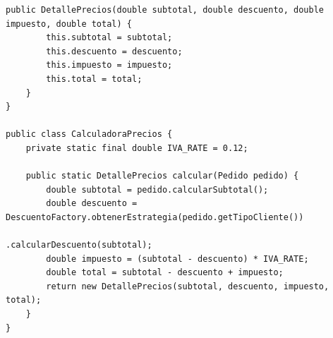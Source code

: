 \documentclass[12pt, a4paper]{article}
\begin{document}
\begin{lstlisting}[caption={Clases de Dominio, Validación y Cálculo de Precios}, label={lst:dominio}]
    public DetallePrecios(double subtotal, double descuento, double impuesto, double total) {
        this.subtotal = subtotal;
        this.descuento = descuento;
        this.impuesto = impuesto;
        this.total = total;
    }
}

public class CalculadoraPrecios {
    private static final double IVA_RATE = 0.12;

    public static DetallePrecios calcular(Pedido pedido) {
        double subtotal = pedido.calcularSubtotal();
        double descuento = DescuentoFactory.obtenerEstrategia(pedido.getTipoCliente())
                                           .calcularDescuento(subtotal);
        double impuesto = (subtotal - descuento) * IVA_RATE;
        double total = subtotal - descuento + impuesto;
        return new DetallePrecios(subtotal, descuento, impuesto, total);
    }
}
\end{lstlisting}

\newpage
\end{document}
